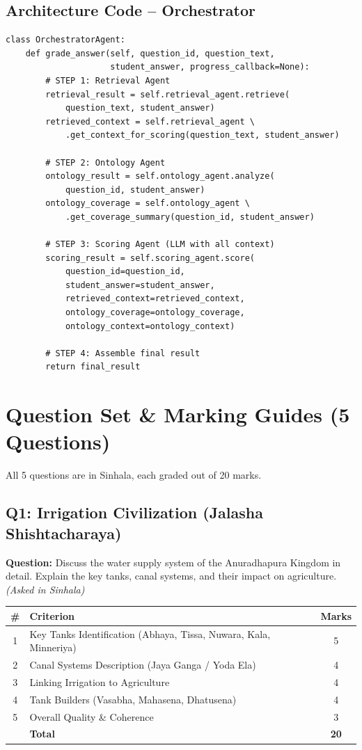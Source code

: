 \documentclass[12pt,a4paper]{article}
\begin{document}
\subsection{Architecture Code -- Orchestrator}
\begin{lstlisting}[caption={Orchestrator workflow (orchestrator.py)}]
class OrchestratorAgent:
    def grade_answer(self, question_id, question_text,
                     student_answer, progress_callback=None):
        # STEP 1: Retrieval Agent
        retrieval_result = self.retrieval_agent.retrieve(
            question_text, student_answer)
        retrieved_context = self.retrieval_agent \
            .get_context_for_scoring(question_text, student_answer)

        # STEP 2: Ontology Agent
        ontology_result = self.ontology_agent.analyze(
            question_id, student_answer)
        ontology_coverage = self.ontology_agent \
            .get_coverage_summary(question_id, student_answer)

        # STEP 3: Scoring Agent (LLM with all context)
        scoring_result = self.scoring_agent.score(
            question_id=question_id,
            student_answer=student_answer,
            retrieved_context=retrieved_context,
            ontology_coverage=ontology_coverage,
            ontology_context=ontology_context)

        # STEP 4: Assemble final result
        return final_result
\end{lstlisting}

\section{Question Set \& Marking Guides (5 Questions)}

All 5 questions are in Sinhala, each graded out of 20 marks.

\subsection{Q1: Irrigation Civilization (Jalasha Shishtacharaya)}
\textbf{Question:} Discuss the water supply system of the Anuradhapura Kingdom in detail. Explain the key tanks, canal systems, and their impact on agriculture. \textit{(Asked in Sinhala)}

\begin{table}[H]
\centering
\begin{tabular}{clc}
\toprule
\# & Criterion & Marks \\
\midrule
1 & Key Tanks Identification (Abhaya, Tissa, Nuwara, Kala, Minneriya) & 5 \\
2 & Canal Systems Description (Jaya Ganga / Yoda Ela) & 4 \\
3 & Linking Irrigation to Agriculture & 4 \\
4 & Tank Builders (Vasabha, Mahasena, Dhatusena) & 4 \\
5 & Overall Quality \& Coherence & 3 \\
\midrule
  & \textbf{Total} & \textbf{20} \\
\bottomrule
\end{tabular}
\end{table}
\end{document}
